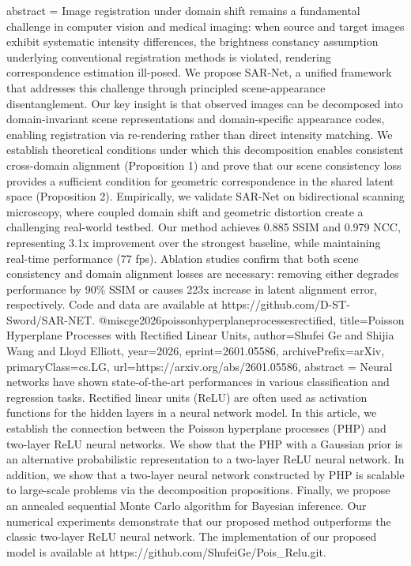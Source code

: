 {      abstract = {Image registration under domain shift remains a fundamental challenge in computer vision and medical imaging: when source and target images exhibit systematic intensity differences, the brightness constancy assumption underlying conventional registration methods is violated, rendering correspondence estimation ill-posed. We propose SAR-Net, a unified framework that addresses this challenge through principled scene-appearance disentanglement. Our key insight is that observed images can be decomposed into domain-invariant scene representations and domain-specific appearance codes, enabling registration via re-rendering rather than direct intensity matching. We establish theoretical conditions under which this decomposition enables consistent cross-domain alignment (Proposition 1) and prove that our scene consistency loss provides a sufficient condition for geometric correspondence in the shared latent space (Proposition 2). Empirically, we validate SAR-Net on bidirectional scanning microscopy, where coupled domain shift and geometric distortion create a challenging real-world testbed. Our method achieves 0.885 SSIM and 0.979 NCC, representing 3.1x improvement over the strongest baseline, while maintaining real-time performance (77 fps). Ablation studies confirm that both scene consistency and domain alignment losses are necessary: removing either degrades performance by 90\% SSIM or causes 223x increase in latent alignment error, respectively. Code and data are available at https://github.com/D-ST-Sword/SAR-NET.}
}@misc{ge2026poissonhyperplaneprocessesrectified,
      title={Poisson Hyperplane Processes with Rectified Linear Units}, 
      author={Shufei Ge and Shijia Wang and Lloyd Elliott},
      year={2026},
      eprint={2601.05586},
      archivePrefix={arXiv},
      primaryClass={cs.LG},
      url={https://arxiv.org/abs/2601.05586},
      abstract = {Neural networks have shown state-of-the-art performances in various classification and regression tasks. Rectified linear units (ReLU) are often used as activation functions for the hidden layers in a neural network model. In this article, we establish the connection between the Poisson hyperplane processes (PHP) and two-layer ReLU neural networks. We show that the PHP with a Gaussian prior is an alternative probabilistic representation to a two-layer ReLU neural network. In addition, we show that a two-layer neural network constructed by PHP is scalable to large-scale problems via the decomposition propositions. Finally, we propose an annealed sequential Monte Carlo algorithm for Bayesian inference. Our numerical experiments demonstrate that our proposed method outperforms the classic two-layer ReLU neural network. The implementation of our proposed model is available at https://github.com/ShufeiGe/Pois_Relu.git.}
}
